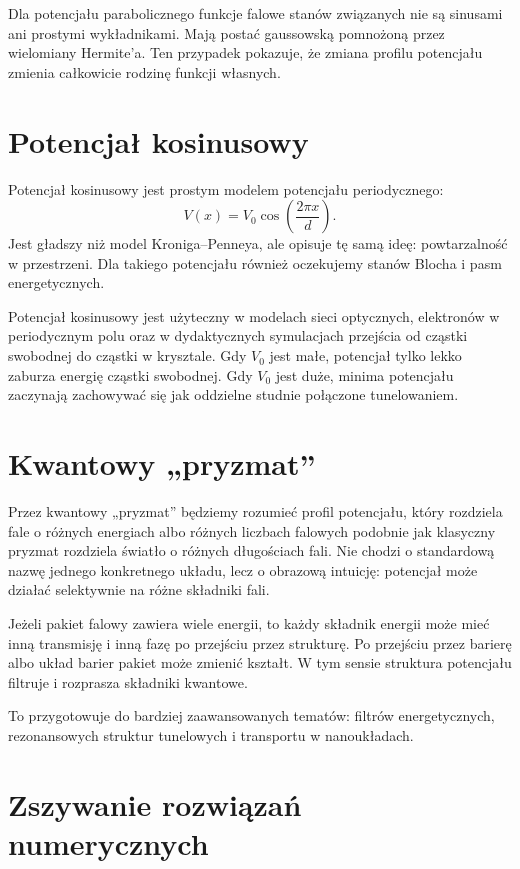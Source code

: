 Dla potencjału parabolicznego funkcje falowe stanów związanych nie są sinusami ani prostymi wykładnikami. Mają postać gaussowską pomnożoną przez wielomiany Hermite'a. Ten przypadek pokazuje, że zmiana profilu potencjału zmienia całkowicie rodzinę funkcji własnych.

\section{Potencjał kosinusowy}

Potencjał kosinusowy jest prostym modelem potencjału periodycznego:
\begin{equation}
    V(x)=V_0\cos\left(\frac{2\pi x}{d}\right).
\end{equation}
Jest gładszy niż model Kroniga--Penneya, ale opisuje tę samą ideę: powtarzalność w przestrzeni. Dla takiego potencjału również oczekujemy stanów Blocha i pasm energetycznych.

Potencjał kosinusowy jest użyteczny w modelach sieci optycznych, elektronów w periodycznym polu oraz w dydaktycznych symulacjach przejścia od cząstki swobodnej do cząstki w krysztale. Gdy \(V_0\) jest małe, potencjał tylko lekko zaburza energię cząstki swobodnej. Gdy \(V_0\) jest duże, minima potencjału zaczynają zachowywać się jak oddzielne studnie połączone tunelowaniem.

\section{Kwantowy „pryzmat”}

Przez kwantowy „pryzmat” będziemy rozumieć profil potencjału, który rozdziela fale o różnych energiach albo różnych liczbach falowych podobnie jak klasyczny pryzmat rozdziela światło o różnych długościach fali. Nie chodzi o standardową nazwę jednego konkretnego układu, lecz o obrazową intuicję: potencjał może działać selektywnie na różne składniki fali.

Jeżeli pakiet falowy zawiera wiele energii, to każdy składnik energii może mieć inną transmisję i inną fazę po przejściu przez strukturę. Po przejściu przez barierę albo układ barier pakiet może zmienić kształt. W tym sensie struktura potencjału filtruje i rozprasza składniki kwantowe.

To przygotowuje do bardziej zaawansowanych tematów: filtrów energetycznych, rezonansowych struktur tunelowych i transportu w nanoukładach.

\section{Zszywanie rozwiązań numerycznych}

